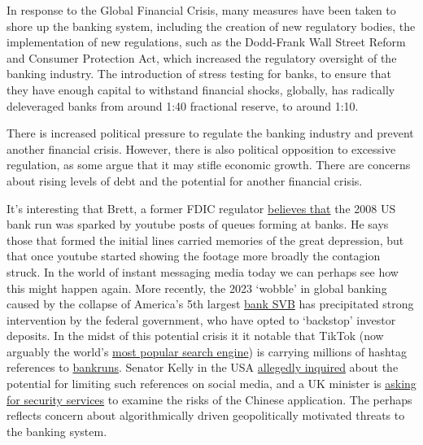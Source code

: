 In response to the Global Financial Crisis, many measures have been taken to shore up the banking system, including the creation of new regulatory bodies, the implementation of new regulations, such as the Dodd-Frank Wall Street Reform and Consumer Protection Act, which increased the regulatory oversight of the banking industry. The introduction of stress testing for banks, to ensure that they have enough capital to withstand financial shocks, globally, has radically deleveraged banks from around 1:40 fractional reserve, to around 1:10.\par 
There is increased political pressure to regulate the banking industry and prevent another financial crisis. However, there is also political opposition to excessive regulation, as some argue that it may stifle economic growth. There are concerns about rising levels of debt and the potential for another financial crisis.\par 
It's interesting that Brett, a former FDIC regulator \href{https://blog.orchid.com/exfdic-regulator-on-trust-and-the-battle-of-the-social-media-videos/}{believes that} the 2008 US bank run was sparked by youtube posts of queues forming at banks. He says those that formed the initial lines carried memories of the great depression, but that once youtube started showing the footage more broadly the contagion struck. In the world of instant messaging media today we can perhaps see how this might happen again. More recently, the 2023 `wobble' in global banking caused by the collapse of America's 5th largest \href{https://theconversation.com/why-svb-and-signature-bank-failed-so-fast-and-the-us-banking-crisis-isnt-over-yet-201737}{bank SVB} has precipitated strong intervention by the federal government, who have opted to `backstop' investor deposits. In the midst of this potential crisis it it notable that TikTok (now arguably the world's \href{https://blog.cloudflare.com/popular-domains-year-in-review-2021/}{most popular search engine}) is carrying millions of hashtag references to \href{https://www.tiktok.com/tag/bankrun?lang=en}{bankruns}. Senator Kelly in the USA \href{https://public.substack.com/p/exclusive-senator-mark-kelly-called}{allegedly inquired} about the potential for limiting such references on social media, and a UK minister is \href{https://news.sky.com/story/tiktok-ban-minister-asks-national-cyber-security-centre-to-look-into-safety-of-app-12833371}{asking for security services} to examine the risks of the Chinese application. The perhaps reflects concern about algorithmically driven geopolitically motivated threats to the banking system.\par
